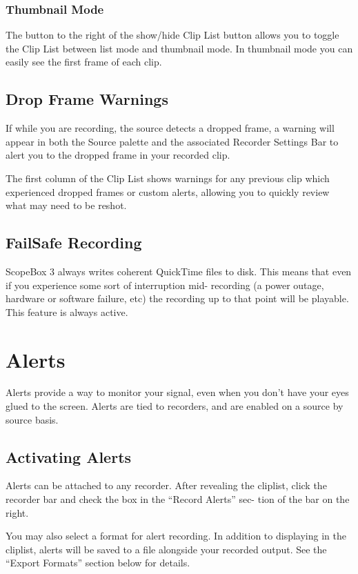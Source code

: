 \documentclass[10,letterpaper,]{report}
\begin{document}
\subsection{Thumbnail Mode}

The button to the right of the show/hide Clip List button allows you to
toggle the Clip List between list mode and thumbnail mode. In thumbnail
mode you can easily see the first frame of each clip.

\section{Drop Frame Warnings}

If while you are recording, the source detects a dropped frame, a
warning will appear in both the Source palette and the associated
Recorder Settings Bar to alert you to the dropped frame in your recorded
clip.

The first column of the Clip List shows warnings for any previous clip
which experienced dropped frames or custom alerts, allowing you to
quickly review what may need to be reshot.

\section{FailSafe Recording}

ScopeBox 3 always writes coherent QuickTime files to disk. This means
that even if you experience some sort of interruption mid- recording (a
power outage, hardware or software failure, etc) the recording up to
that point will be playable. This feature is always active.

\chapter{Alerts}

Alerts provide a way to monitor your signal, even when you don't have
your eyes glued to the screen. Alerts are tied to recorders, and are
enabled on a source by source basis.

\section{Activating Alerts}

Alerts can be attached to any recorder. After revealing the cliplist,
click the recorder bar and check the box in the ``Record Alerts'' sec-
tion of the bar on the right.

You may also select a format for alert recording. In addition to
displaying in the cliplist, alerts will be saved to a file alongside
your recorded output. See the ``Export Formats'' section below for
details.
\end{document}
